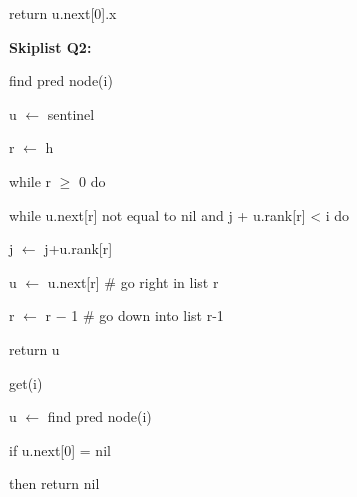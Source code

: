 \documentclass[12pt]{article}
\renewcommand{\_}{\kern-1.5pt\textunderscore\kern-1.5pt}
\begin{document}
\begin{adjustwidth}{0.5in}{0.0in}
return u.next[0].x\par

\end{adjustwidth}


\vspace{\baselineskip}
\textbf{Skiplist Q2:}\par


\vspace{\baselineskip}
find pred node(i) \par

u $ \leftarrow $  sentinel \par

r $ \leftarrow $  h \par

while r $ \geq $  0 do \par

\begin{adjustwidth}{0.5in}{0.0in}
while u.next[r] not equal to nil and j + u.rank[r] < i do \par

\end{adjustwidth}

\begin{adjustwidth}{0.5in}{0.0in}
\tab j $ \leftarrow $  j+u.rank[r]\par

\end{adjustwidth}

\begin{adjustwidth}{1.0in}{0.0in}
u $ \leftarrow $  u.next[r] $\#$  go right in list r\par

\end{adjustwidth}

\begin{adjustwidth}{1.0in}{0.0in}
 r $ \leftarrow $  r $-$  1 $\#$  go down into list r-1 \par

\end{adjustwidth}

return u \par

get(i) \par

u $ \leftarrow $  find pred node(i)\par

if u.next[0] = nil \par

\begin{adjustwidth}{0.5in}{0.0in}
then return nil \par

\end{adjustwidth}
\end{document}
